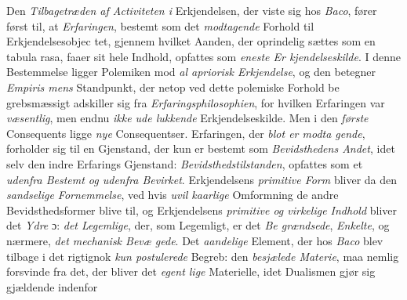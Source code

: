 Den \emph{Tilbagetræden af Activiteten i} Erkjendelsen,
der viste sig hos \emph{Baco}, fører først til, at \emph{Erfaringen},
bestemt som det \emph{modtagende} Forhold til Erkjendelsesobjec\-%
tet, gjennem hvilket Aanden, der oprindelig sættes som en
tabula rasa, faaer sit hele Indhold, opfattes som \emph{eneste Er\-%
kjendelseskilde}. I denne Bestemmelse ligger Polemiken mod
\emph{al apriorisk Erkjendelse}, og den betegner \emph{Empiris\-%
mens} Standpunkt, der netop ved dette polemiske Forhold be\-%
grebsmæssigt adskiller sig fra \emph{Erfaringsphilosophien}, for
hvilken Erfaringen var \emph{væsentlig}, men endnu \emph{ikke ude\-%
lukkende} Erkjendelseskilde. Men i den \emph{første} Consequents
ligge \emph{nye} Consequentser. Erfaringen, der \emph{blot er modta\-%
gende}, forholder sig til en Gjenstand, der kun er bestemt
som \emph{Bevidsthedens Andet}, idet selv den indre Erfarings
Gjenstand: \emph{Bevidsthedstilstanden}, opfattes som et \emph{udenfra
Bestemt og udenfra Bevirket}. Erkjendelsens \emph{primitive Form}
bliver da den \emph{sandselige Fornemmelse}, ved hvis \emph{uvil\-%
kaarlige} Omformning de andre Bevidsthedsformer blive til,
og Erkjendelsens \emph{primitive og virkelige Indhold} bliver
det \emph{Ydre} ɔ: \emph{det Legemlige}, der, som Legemligt, er det \emph{Be\-%
grændsede}, \emph{Enkelte}, og nærmere, \emph{det mechanisk Bevæ\-%
gede}. Det \emph{aandelige} Element, der hos \emph{Baco} blev tilbage
i det rigtignok \emph{kun postulerede} Begreb: den \emph{besjælede
Materie}, maa nemlig forsvinde fra det, der bliver det \emph{egent\-%
lige} Materielle, idet Dualismen gjør sig gjældende indenfor
